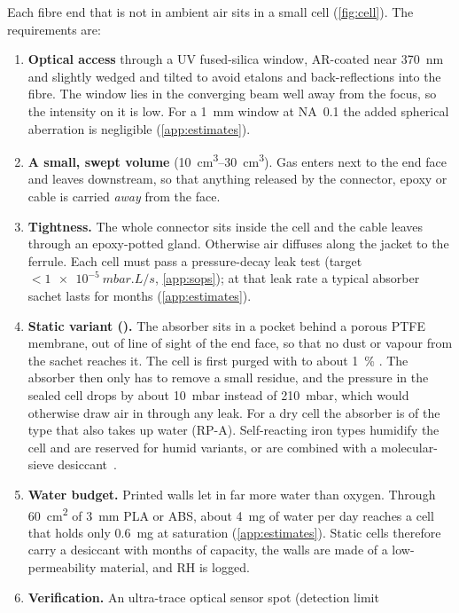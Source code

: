 Each fibre end that is not in ambient air sits in a small cell (\cref{fig:cell}). The requirements are:
\begin{enumerate}
  \item \textbf{Optical access} through a UV fused-silica window, AR-coated near \SI{370}{nm} and
        slightly wedged and tilted to avoid etalons and back-reflections into the fibre. The window lies
        in the converging beam well away from the focus, so the intensity on it is low. For a
        \SI{1}{mm} window at NA~0.1 the added spherical aberration is negligible
        (\cref{app:estimates}).
  \item \textbf{A small, swept volume} (\SIrange{10}{30}{cm^3}). Gas enters next to the end face and
        leaves downstream, so that anything released by the connector, epoxy or cable is carried
        \emph{away} from the face.
  \item \textbf{Tightness.} The whole connector sits inside the cell and the cable leaves through an
        epoxy-potted gland. Otherwise air diffuses along the jacket to the ferrule. Each cell must pass a
        pressure-decay leak test (target $<\SI{1e-5}{mbar.L/s}$, \cref{app:sops}); at that leak rate a
        typical absorber sachet lasts for months (\cref{app:estimates}).
  \item \textbf{Static variant ().} The absorber sits in a pocket behind a porous PTFE
        membrane, out of line of sight of the end face, so that no dust or vapour from the sachet
        reaches it. The cell is first purged with \Ntwo{} to about \SI{1}{\percent} \Oxy{}. The absorber
        then only has to remove a small residue, and the pressure in the sealed cell drops by about
        \SI{10}{mbar} instead of \SI{210}{mbar}, which would otherwise draw air in through any leak.
        For a dry cell the absorber is of the type that also takes up water (RP-A). Self-reacting iron
        types humidify the cell and are reserved for humid variants, or are combined with a molecular-sieve
        desiccant~\cite{MGCRP,Daniel1993}.
  \item \textbf{Water budget.} Printed walls let in far more water than oxygen. Through \SI{60}{cm^2} of
        \SI{3}{mm} PLA or ABS, about \SI{4}{mg} of water per day reaches a cell that holds only
        \SI{0.6}{mg} at saturation (\cref{app:estimates}). Static cells therefore carry a desiccant with
        months of capacity, the walls are made of a low-permeability material, and RH is logged.
  \item \textbf{Verification.} An ultra-trace optical \Oxy{} sensor spot (detection limit

\end{enumerate}

